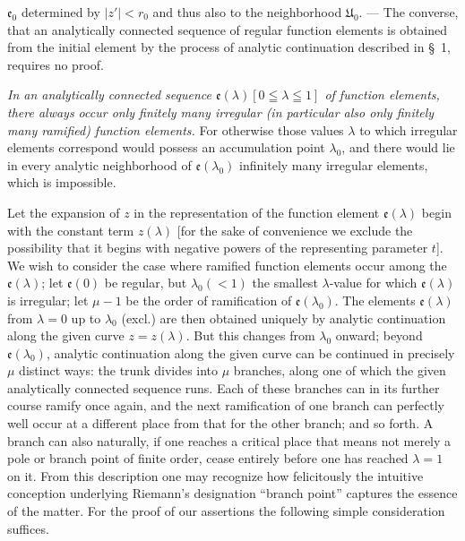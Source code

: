 \documentclass{article}
\begin{document}
$\mathfrak{e}_0$ determined by $|z'| < r_0$ and thus also to the neighborhood $\mathfrak{U}_0$. --- The converse, that an analytically connected sequence of regular function elements is obtained from the initial element by the process of analytic continuation described in §~1, requires no proof.

\emph{In an analytically connected sequence $\mathfrak{e}(\lambda) [0 \leqq \lambda \leqq 1]$ of function elements, there always occur only finitely many irregular (in particular also only finitely many ramified) function elements.} For otherwise those values $\lambda$ to which irregular elements correspond would possess an accumulation point $\lambda_0$, and there would lie in every analytic neighborhood of $\mathfrak{e}(\lambda_0)$ infinitely many irregular elements, which is impossible.

Let the expansion of $z$ in the representation of the function element $\mathfrak{e}(\lambda)$ begin with the constant term $z(\lambda)$ [for the sake of convenience we exclude the possibility that it begins with negative powers of the representing parameter $t$]. We wish to consider the case where ramified function elements occur among the $\mathfrak{e}(\lambda)$; let $\mathfrak{e}(0)$ be regular, but $\lambda_0 (< 1)$ the smallest $\lambda$-value for which $\mathfrak{e}(\lambda)$ is irregular; let $\mu - 1$ be the order of ramification of $\mathfrak{e}(\lambda_0)$. The elements $\mathfrak{e}(\lambda)$ from $\lambda = 0$ up to $\lambda_0$ (excl.) are then obtained uniquely by analytic continuation along the given curve $z = z(\lambda)$. But this changes from $\lambda_0$ onward; beyond $\mathfrak{e}(\lambda_0)$, analytic continuation along the given curve can be continued in precisely $\mu$ distinct ways: the trunk divides into $\mu$ branches, along one of which the given analytically connected sequence runs. Each of these branches can in its further course ramify once again, and the next ramification of one branch can perfectly well occur at a different place from that for the other branch; and so forth. A branch can also naturally, if one reaches a critical place that means not merely a pole or branch point of finite order, cease entirely before one has reached $\lambda = 1$ on it. From this description one may recognize how felicitously the intuitive conception underlying Riemann's designation ``branch point'' captures the essence of the matter. For the proof of our assertions the following simple consideration suffices.
\end{document}
